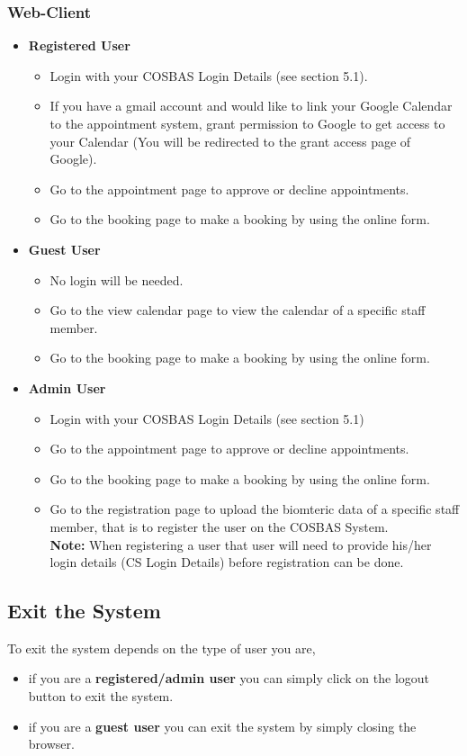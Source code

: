 \subsubsection{Web-Client}
	\begin{itemize}
		\item{\textbf{Registered User}} 
			\begin{itemize}
				\item{Login with your COSBAS Login Details (see section 5.1).} 
				\item{If you have a gmail account and would like to link your Google Calendar to the appointment system, grant permission to Google to get access to your Calendar (You will be redirected to the grant access page of Google).}
				\item{Go to the appointment page to approve or decline appointments.}
				\item{Go to the booking page to make a booking by using the online form.}
			\end{itemize}

		\item{\textbf{Guest User} }
			\begin{itemize}
				\item{No login will be needed.}
				\item{Go to the view calendar page to view the calendar of a specific staff member.}
				\item{Go to the booking page to make a booking by using the online form.}
			\end{itemize}

		\item{\textbf{Admin User} }
			\begin{itemize}
				\item{Login with your COSBAS Login Details (see section 5.1)} 
				\item{Go to the appointment page to approve or decline appointments.}
				\item{Go to the booking page to make a booking by using the online form.}
				\item{Go to the registration page to upload the biomteric data of a specific staff member, that is to register the user on the COSBAS System.\\
\textbf{Note:} When registering a user that user will need to provide his/her login details (CS Login Details) before registration can be done.}
			\end{itemize}
	\end{itemize}

\subsection{Exit the System}
To exit the system depends on the type of user you are,
	\begin{itemize}
		\item{if you are a \textbf{registered/admin user} you can simply click on the logout button to exit the system.} 
		\item{if you are a \textbf{guest user} you can exit the system by simply closing the browser.}
	\end{itemize}


